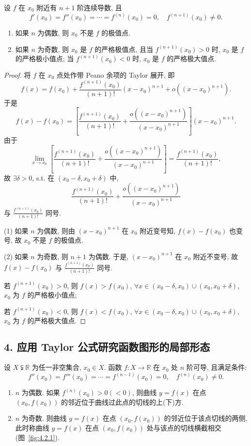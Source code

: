 \begin{theorem}\label{thm:4.2.1}
设 $f$ 在 $x_{0}$ 附近有 $n+1$ 阶连续导数, 且
\[
f'(x_{0})=f''(x_{0})=\cdots=f^{(n)}(x_{0})=0,\quad f^{(n+1)}(x_{0})\neq 0.
\]
\begin{enumerate}[label=(\arabic*)]
  \item 如果 $n$ 为偶数, 则 $x_{0}$ 不是 $f$ 的极值点.
  \item 如果 $n$ 为奇数, 则 $x_{0}$ 是 $f$ 的严格极值点, 且当 $f^{(n+1)}(x_{0})>0$ 时, $x_{0}$ 是 $f$ 的严格极小值点; 当 $f^{(n+1)}(x_{0})<0$ 时, $x_{0}$ 是 $f$ 的严格极大值点.
\end{enumerate}
\end{theorem}

\begin{proof}
将 $f$ 在 $x_{0}$ 点处作带 Peano 余项的 Taylor 展开, 即
\[
f(x)=f(x_{0})+\frac{f^{(n+1)}(x_{0})}{(n+1)!}(x-x_{0})^{n+1}+o((x-x_{0})^{n+1}).
\]
于是
\[
f(x)-f(x_{0})=\left[\frac{f^{(n+1)}(x_{0})}{(n+1)!}+\frac{o((x-x_{0})^{n+1})}{(x-x_{0})^{n+1}}\right](x-x_{0})^{n+1}.
\]
由于
\[
\lim_{x\to x_{0}}\left[\frac{f^{(n+1)}(x_{0})}{(n+1)!}+\frac{o((x-x_{0})^{n+1})}{(x-x_{0})^{n+1}}\right]=\frac{f^{(n+1)}(x_{0})}{(n+1)!},
\]
故 $\exists\delta>0$, s.t. 在 $(x_{0}-\delta,x_{0}+\delta)$ 中,
\[
\frac{f^{(n+1)}(x_{0})}{(n+1)!}+\frac{o((x-x_{0})^{n+1})}{(x-x_{0})^{n+1}}
\]
与 $\frac{f^{(n+1)}(x_{0})}{(n+1)!}$ 同号.

(1) 如果 $n$ 为偶数, 则由 $(x-x_{0})^{n+1}$ 在 $x_{0}$ 附近变号知, $f(x)-f(x_{0})$ 也变号, 故 $x_{0}$ 不是 $f$ 的极值点.

(2) 如果 $n$ 为奇数, 则 $n+1$ 为偶数. 于是, $(x-x_{0})^{n+1}$ 在 $x_{0}$ 附近不变号, 故 $f(x)-f(x_{0})$ 与 $\frac{f^{(n+1)}(x_{0})}{(n+1)!}$ 同号.

若 $f^{(n+1)}(x_{0})>0$, 则 $f(x)>f(x_{0})$, $\forall x\in(x_{0}-\delta,x_{0})\cup(x_{0},x_{0}+\delta)$, $x_{0}$ 为 $f$ 的严格极小值点;

若 $f^{(n+1)}(x_{0})<0$, 则 $f(x)<f(x_{0})$, $\forall x\in(x_{0}-\delta,x_{0})\cup(x_{0},x_{0}+\delta)$, $x_{0}$ 为 $f$ 的严格极大值点.
\end{proof}

\subsection*{4. 应用 Taylor 公式研究函数图形的局部形态}

\begin{theorem}\label{thm:4.2.2}
设 $X \subsetneqq \mathbb{R}$ 为任一非空集合, $x_{0} \in X$. 函数 $f\colon X \to \mathbb{R}$ 在 $x_{0}$ 处 $n$ 阶可导, 且满足条件:
\[
f''(x_{0})=f'''(x_{0})=\cdots=f^{(n-1)}(x_{0})=0,\quad f^{(n)}(x_{0})\neq 0.
\]
\begin{enumerate}[label=(\arabic*)]
  \item $n$ 为偶数. 如果 $f^{(n)}(x_{0})>0(<0)$, 则曲线 $y=f(x)$ 在点 $(x_{0}, f(x_{0}))$ 的邻近位于曲线过此点的切线的上(下)方.
  \item $n$ 为奇数. 则曲线 $y = f(x)$ 在点 $(x_{0}, f(x_{0}))$ 的邻近位于该点切线的两侧, 此时称曲线 $y = f(x)$ 在点 $(x_{0}, f(x_{0}))$ 处与该点的切线横截相交(图~\ref{fig:4.2.1}).
\end{enumerate}
\end{theorem}

